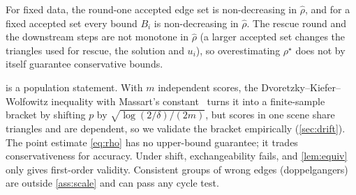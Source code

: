 \begin{corollary}\label{cor:mono}
For fixed data, the round-one accepted edge set is non-decreasing in $\hat\rho$, and for a fixed accepted set every bound $B_i$ is non-decreasing in $\hat\rho$. The rescue round and the downstream steps are not monotone in $\hat\rho$ (a larger accepted set changes the triangles used for rescue, the solution and $u_i$), so overestimating $\rho^\star$ does not by itself guarantee conservative bounds.
\end{corollary}

\begin{remark}\label{rem:guar}
 is a population statement. With $m$ independent scores, the Dvoretzky--Kiefer--Wolfowitz inequality with Massart's constant~\cite{massart1990tight} turns it into a finite-sample bracket by shifting $p$ by $\sqrt{\log(2/\delta)/(2m)}$, but scores in one scene share triangles and are dependent, so we validate the bracket empirically (\cref{sec:drift}). The point estimate \eqref{eq:rho} has no upper-bound guarantee; it trades conservativeness for accuracy. Under shift, exchangeability fails, and \cref{lem:equiv} only gives first-order validity. Consistent groups of wrong edges (doppelgangers) are outside \cref{ass:scale} and can pass any cycle test.
\end{remark}
